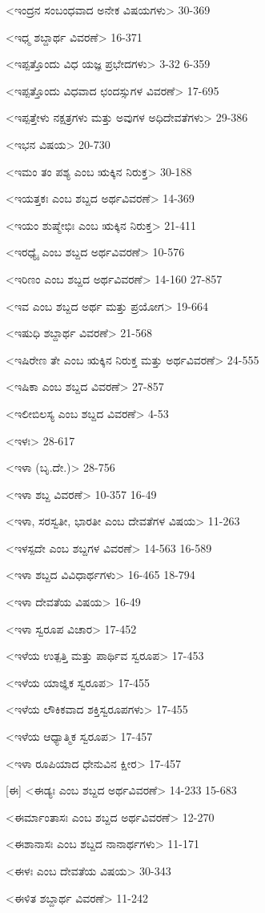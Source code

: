 <ಇಂದ್ರನ ಸಂಬಂಧವಾದ ಅನೇಕ ವಿಷಯಗಳು>
30-369

<ಇಧ್ಮ ಶಬ್ದಾರ್ಥ ವಿವರಣೆ>
16-371

<ಇಪ್ಪತ್ತೊಂದು ವಿಧ ಯಜ್ಞ ಪ್ರಭೇದಗಳು>
3-32
6-359

<ಇಪ್ಪತ್ತೊಂದು ವಿಧವಾದ ಛಂದಸ್ಸುಗಳ ವಿವರಣೆ>
17-695

<ಇಪ್ಪತ್ತೇಳು ನಕ್ಷತ್ರಗಳು ಮತ್ತು ಅವುಗಳ ಅಧಿದೇವತೆಗಳು>
29-386

<ಇಭನ ವಿಷಯ>
20-730

<ಇಮಂ ತಂ ಪಶ್ಯ ಎಂಬ ಋಕ್ಕಿನ ನಿರುಕ್ತ>
30-188


<ಇಯತ್ತಕಃ ಎಂಬ ಶಬ್ದದ ಅರ್ಥವಿವರಣೆ>
14-369

<ಇಯಂ ಶುಷ್ಮೇಭಿಃ ಎಂಬ ಋಕ್ಕಿನ ನಿರುಕ್ತ>
21-411

<ಇರಧ್ಯೈ ಎಂಬ ಶಬ್ದದ ಅರ್ಥವಿವರಣೆ>
10-576

<ಇರಿಣಂ ಎಂಬ ಶಬ್ದದ ಅರ್ಥವಿವರಣೆ>
14-160
27-857

<ಇವ ಎಂಬ ಶಬ್ದದ ಅರ್ಥ ಮತ್ತು ಪ್ರಯೋಗ>
19-664

<ಇಷುಧಿ ಶಬ್ದಾರ್ಥ ವಿವರಣೆ>
21-568

<ಇಷಿರೇಣ ತೇ ಎಂಬ ಋಕ್ಕಿನ ನಿರುಕ್ತ ಮತ್ತು ಅರ್ಥವಿವರಣೆ>
24-555

<ಇಷಿಕಾ ಎಂಬ ಶಬ್ದದ ವಿವರಣೆ>
27-857

<ಇಲೀಬಿಲಸ್ಯ ಎಂಬ ಶಬ್ದದ ವಿವರಣೆ>
4-53

<ಇಳಃ>
28-617

<ಇಳಾ (ಬೃ.ದೇ.)>
28-756

<ಇಳಾ ಶಬ್ದ ವಿವರಣೆ>
10-357
16-49

<ಇಳಾ, ಸರಸ್ವತೀ, ಭಾರತೀ ಎಂಬ ದೇವತೆಗಳ ವಿಷಯ>
11-263

<ಇಳಸ್ಪದೇ ಎಂಬ ಶಬ್ದಗಳ ವಿವರಣೆ>
14-563
16-589

<ಇಳಾ ಶಬ್ದದ ವಿವಿಧಾರ್ಥಗಳು>
16-465
18-794

<ಇಳಾ ದೇವತೆಯ ವಿಷಯ>
16-49

<ಇಳಾ ಸ್ವರೂಪ ವಿಚಾರ>
17-452

<ಇಳೆಯ ಉತ್ಪತ್ತಿ ಮತ್ತು ಪಾರ್ಥಿವ ಸ್ವರೂಪ>
17-453

<ಇಳೆಯ ಯಾಜ್ಞಿಕ ಸ್ವರೂಪ>
17-455

<ಇಳೆಯ ಲೌಕಿಕವಾದ ಶಕ್ತಿಸ್ವರೂಪಗಳು>
17-455

<ಇಳೆಯ ಆಧ್ಯಾತ್ಮಿಕ ಸ್ವರೂಪ>
17-457

<ಇಳಾ ರೂಪಿಯಾದ ಧೇನುವಿನ ಕ್ಷೀರ>
17-457

[ಈ]
<ಈಡ್ಯಃ ಎಂಬ ಶಬ್ದದ ಅರ್ಥವಿವರಣೆ>
14-233
15-683

<ಈರ್ಮಾಂತಾಸಃ ಎಂಬ ಶಬ್ದದ ಅರ್ಥವಿವರಣೆ>
12-270

<ಈಶಾನಾಸಃ ಎಂಬ ಶಬ್ದದ ನಾನಾರ್ಥಗಳು>
11-171

<ಈಳಃ ಎಂಬ ದೇವತೆಯ ವಿಷಯ>
30-343

<ಈಳಿತ ಶಬ್ದಾರ್ಥ ವಿವರಣೆ>
11-242

